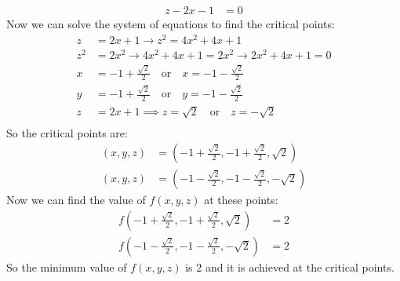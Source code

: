 \documentclass[12pt]{article}
\begin{document}
\begin{qsolve}[solution]
\begin{align*}
        z - 2x - 1                   & = 0
    \end{align*}
    Now we can solve the system of equations to find the critical points:
    \begin{align*}
        z   & = 2x + 1 \rightarrow z^2 = 4x^2 + 4x + 1                                    \\
        z^2 & = 2x^2 \rightarrow 4x^2 + 4x + 1 = 2x^2 \rightarrow 2x^2 + 4x + 1 = 0       \\
        x   & = -1 + \frac{\sqrt{2}}{2} \quad \text{or} \quad x = -1 - \frac{\sqrt{2}}{2} \\
        y   & = -1 + \frac{\sqrt{2}}{2} \quad \text{or} \quad y = -1 - \frac{\sqrt{2}}{2} \\
        z   & = 2x + 1 \implies z = \sqrt{2} \quad \text{or} \quad z = -\sqrt{2}          \\
    \end{align*}
    So the critical points are:
    \begin{align*}
        (x,y,z) & = \left(-1 + \frac{\sqrt{2}}{2}, -1 + \frac{\sqrt{2}}{2}, \sqrt{2}\right)  \\
        (x,y,z) & = \left(-1 - \frac{\sqrt{2}}{2}, -1 - \frac{\sqrt{2}}{2}, -\sqrt{2}\right)
    \end{align*}
    \splitqsolve
    Now we can find the value of $f(x,y,z)$ at these points:
    \begin{align*}
        f\left(-1 + \frac{\sqrt{2}}{2}, -1 + \frac{\sqrt{2}}{2}, \sqrt{2}\right)  & = 2 \\
        f\left(-1 - \frac{\sqrt{2}}{2}, -1 - \frac{\sqrt{2}}{2}, -\sqrt{2}\right) & = 2
    \end{align*}
    So the minimum value of $f(x,y,z)$ is 2 and it is achieved at the critical points.
\end{qsolve}
\end{document}

